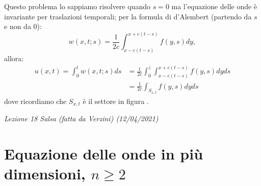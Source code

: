 \documentclass[10pt,a4paper,twoside,openright]{book}
\begin{document}
Questo problema lo sappiamo risolvere quando $\displaystyle s=0$ ma l'equazione delle onde è invariante per traslazioni temporali; per la formula di d'Alembert (partendo da $\displaystyle s$ e non da $\displaystyle 0$):
\begin{equation*}
	w( x,t;s) =\frac{1}{2c}\int _{x-c( t-s)}^{x+c( t-s)} f( y,s) dy,
\end{equation*}
allora:
\begin{align*}
	u( x,t) =\int _{0}^{t} w( x,t;s) ds & =\frac{1}{2c}\int _{0}^{z}\int _{x-c( t-s)}^{x+c( t-s)} f( y,s) dyds \\
	                                    & =\frac{1}{2c}\int _{S_{x,t}} f( y,s) dyds                            
\end{align*}
dove ricordiamo che $\displaystyle S_{x,t}$ è il settore in figura .


\textit{Lezione 18 Salsa (fatta da Verzini) (12/04/2021)}
\section{Equazione delle onde in più dimensioni, \texorpdfstring{$n\geqslant 2$}{n>2}}
\end{document}
